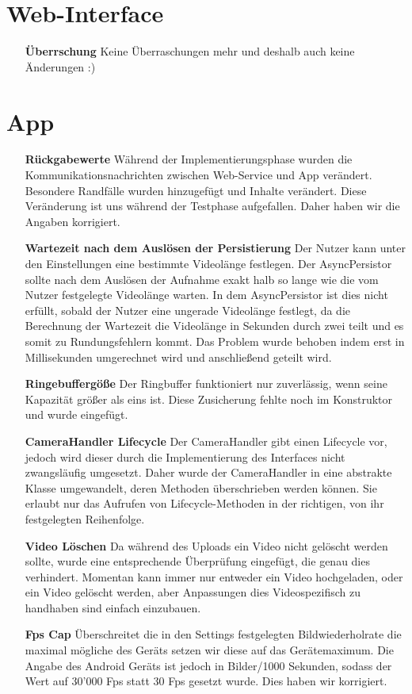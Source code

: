 \section{Web-Interface}
\begin{itemize}
\item [\textbf{Überrschung}] Keine Überraschungen mehr und deshalb auch keine Änderungen :)
\end{itemize}
\section{App}
\begin{itemize}
\item [\textbf{Rückgabewerte}] Während der Implementierungsphase wurden die Kommunikationsnachrichten zwischen Web-Service und App verändert. Besondere Randfälle wurden hinzugefügt und Inhalte verändert. Diese Veränderung ist uns während der Testphase aufgefallen. Daher haben wir die Angaben korrigiert.
\item [\textbf{Wartezeit nach dem Auslösen der Persistierung}] Der Nutzer kann unter den Einstellungen eine bestimmte Videolänge festlegen. Der AsyncPersistor sollte nach dem Auslösen der Aufnahme exakt halb so lange wie die vom Nutzer festgelegte Videolänge warten. In dem AsyncPersistor ist dies nicht erfüllt, sobald der Nutzer eine ungerade Videolänge festlegt, da die Berechnung der Wartezeit die Videolänge in Sekunden durch zwei teilt und es somit zu Rundungsfehlern kommt. Das Problem wurde behoben indem erst in Millisekunden umgerechnet wird und anschließend geteilt wird.
\item [\textbf{Ringebuffergöße}] Der Ringbuffer funktioniert nur zuverlässig, wenn seine Kapazität größer als eins ist. Diese Zusicherung fehlte noch im Konstruktor und wurde eingefügt.
\item [\textbf{CameraHandler Lifecycle}] Der CameraHandler gibt einen Lifecycle vor, jedoch wird dieser durch die Implementierung des Interfaces nicht zwangsläufig umgesetzt. Daher wurde der CameraHandler in eine abstrakte Klasse umgewandelt, deren Methoden überschrieben werden können. Sie erlaubt nur das Aufrufen von Lifecycle-Methoden in der richtigen, von ihr festgelegten Reihenfolge.
\item [\textbf{Video Löschen}] Da während des Uploads ein Video nicht gelöscht werden sollte, wurde eine entsprechende Überprüfung eingefügt, die genau dies verhindert. Momentan kann immer nur entweder ein Video hochgeladen, oder ein Video gelöscht werden, aber Anpassungen dies Videospezifisch zu handhaben sind einfach einzubauen.
\item[\textbf{Fps Cap}] Überschreitet die in den Settings festgelegten Bildwiederholrate die maximal mögliche des Geräts setzen wir diese auf das Gerätemaximum. Die Angabe des Android Geräts ist jedoch in Bilder/1000 Sekunden, sodass der Wert auf 30'000 Fps statt 30 Fps gesetzt wurde. Dies haben wir korrigiert.
\end{itemize}